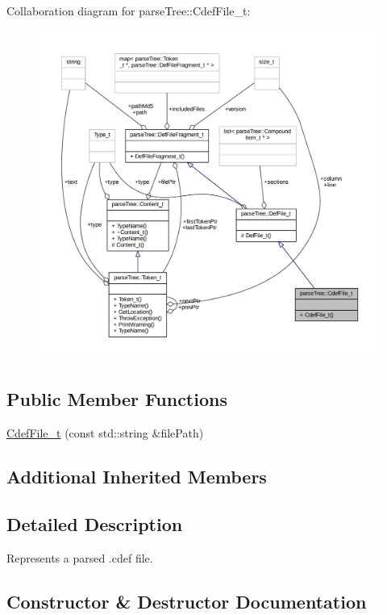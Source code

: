 Collaboration diagram for parse\+Tree\+:\+:Cdef\+File\+\_\+t\+:
\nopagebreak
\begin{figure}[H]
\begin{center}
\leavevmode
\includegraphics[width=350pt]{structparse_tree_1_1_cdef_file__t__coll__graph}
\end{center}
\end{figure}
\subsection*{Public Member Functions}
\begin{DoxyCompactItemize}
\item 
\hyperlink{structparse_tree_1_1_cdef_file__t_a117c95bd958e6dd9e42c1f8fcf9a412d}{Cdef\+File\+\_\+t} (const std\+::string \&file\+Path)
\end{DoxyCompactItemize}
\subsection*{Additional Inherited Members}


\subsection{Detailed Description}
Represents a parsed .cdef file. 

\subsection{Constructor \& Destructor Documentation}

